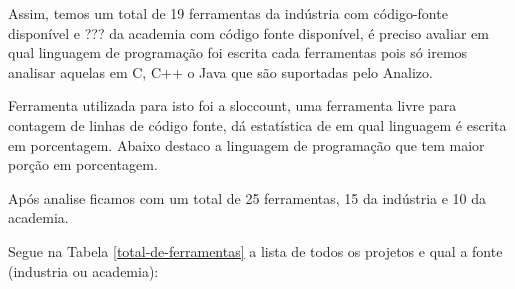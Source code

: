 \documentclass[12pt]{article}
\begin{document}
Assim, temos um total de 19 ferramentas da indústria com código-fonte
disponível e ??? da academia com código fonte disponível, é preciso avaliar em
qual linguagem de programação foi escrita cada ferramentas pois só iremos
analisar aquelas em C, C++ o Java que são suportadas pelo Analizo.

Ferramenta utilizada para isto foi a sloccount, uma ferramenta livre para
contagem de linhas de código fonte, dá estatística de em qual linguagem
é escrita em porcentagem. Abaixo destaco a linguagem de programação que
tem maior porção em porcentagem.

Após analise ficamos com um total de 25 ferramentas, 15 da indústria e 10 da
academia.

Segue na Tabela \ref{total-de-ferramentas} a lista de todos os projetos e qual
a fonte (industria ou academia):
\end{document}
